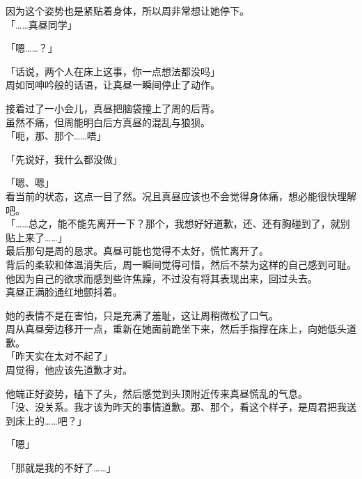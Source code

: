 因为这个姿势也是紧贴着身体，所以周非常想让她停下。\\

「……真昼同学」

「嗯……？」

「话说，两个人在床上这事，你一点想法都没吗」\\

周如同呻吟般的话语，让真昼一瞬间停止了动作。

接着过了一小会儿，真昼把脑袋撞上了周的后背。\\

虽然不痛，但周能明白后方真昼的混乱与狼狈。\\

「呃，那、那个……唔」

「先说好，我什么都没做」

「嗯、嗯」\\

看当前的状态，这点一目了然。况且真昼应该也不会觉得身体痛，想必能很快理解吧。\\

「……总之，能不能先离开一下？那个，我想好好道歉，还、还有胸碰到了，就别贴上来了……」\\

最后那句是周的恳求。真昼可能也觉得不太好，慌忙离开了。\\

背后的柔软和体温消失后，周一瞬间觉得可惜，然后不禁为这样的自己感到可耻。\\

他因为自己的欲求而感到些许焦躁，不过没有将其表现出来，回过头去。\\

真昼正满脸通红地颤抖着。

她的表情不是在害怕，只是充满了羞耻，这让周稍微松了口气。\\

周从真昼旁边移开一点，重新在她面前跪坐下来，然后手指撑在床上，向她低头道歉。\\

「昨天实在太对不起了」\\

周觉得，他应该先道歉才对。

他端正好姿势，磕下了头，然后感觉到头顶附近传来真昼慌乱的气息。\\

「没、没关系。我才该为昨天的事情道歉。那、那个，看这个样子，是周君把我送到床上的……吧？」

「嗯」

「那就是我的不好了……」


